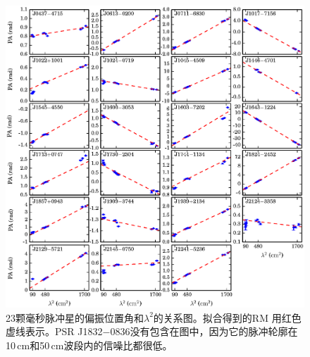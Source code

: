 \begin{figure}
\begin{center}
\includegraphics[width=6 in]{rm.ps}
\caption{23颗毫秒脉冲星的偏振位置角和$\lambda^2$的关系图。拟合得到的RM
用红色虚线表示。PSR J1832$-$0836没有包含在图中，因为它的脉冲轮廓在10\,cm和50\,cm波段内的信噪比都很低。} 
\label{rmFreq}
\end{center}
\end{figure}

